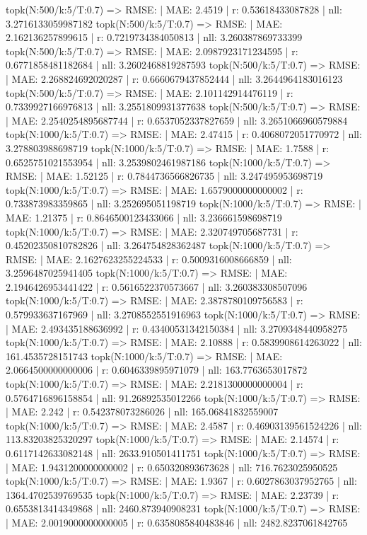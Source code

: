 topk(N:500/k:5/T:0.7) => RMSE: | MAE: 2.4519 | r: 0.53618433087828 | nll: 3.2716133059987182
topk(N:500/k:5/T:0.7) => RMSE: | MAE: 2.162136257899615 | r: 0.7219734384050813 | nll: 3.260387869733399
topk(N:500/k:5/T:0.7) => RMSE: | MAE: 2.0987923171234595 | r: 0.6771858481182684 | nll: 3.2602468819287593
topk(N:500/k:5/T:0.7) => RMSE: | MAE: 2.268824692020287 | r: 0.6660679437852444 | nll: 3.2644964183016123
topk(N:500/k:5/T:0.7) => RMSE: | MAE: 2.101142914476119 | r: 0.7339927166976813 | nll: 3.2551809931377638
topk(N:500/k:5/T:0.7) => RMSE: | MAE: 2.2540254895687744 | r: 0.6537052337827659 | nll: 3.2651066960579884
topk(N:1000/k:5/T:0.7) => RMSE: | MAE: 2.47415 | r: 0.4068072051770972 | nll: 3.278803988698719
topk(N:1000/k:5/T:0.7) => RMSE: | MAE: 1.7588 | r: 0.6525751021553954 | nll: 3.2539802461987186
topk(N:1000/k:5/T:0.7) => RMSE: | MAE: 1.52125 | r: 0.7844736566826735 | nll: 3.247495953698719
topk(N:1000/k:5/T:0.7) => RMSE: | MAE: 1.6579000000000002 | r: 0.733873983359865 | nll: 3.252695051198719
topk(N:1000/k:5/T:0.7) => RMSE: | MAE: 1.21375 | r: 0.8646500123433066 | nll: 3.236661598698719
topk(N:1000/k:5/T:0.7) => RMSE: | MAE: 2.320749705687731 | r: 0.45202350810782826 | nll: 3.264754828362487
topk(N:1000/k:5/T:0.7) => RMSE: | MAE: 2.1627623255224533 | r: 0.5009316008666859 | nll: 3.2596487025941405
topk(N:1000/k:5/T:0.7) => RMSE: | MAE: 2.1946426953441422 | r: 0.5616522370573667 | nll: 3.260383308507096
topk(N:1000/k:5/T:0.7) => RMSE: | MAE: 2.3878780109756583 | r: 0.579933637167969 | nll: 3.2708552551916963
topk(N:1000/k:5/T:0.7) => RMSE: | MAE: 2.493435188636992 | r: 0.43400531342150384 | nll: 3.2709348440958275
topk(N:1000/k:5/T:0.7) => RMSE: | MAE: 2.10888 | r: 0.5839908614263022 | nll: 161.4535728151743
topk(N:1000/k:5/T:0.7) => RMSE: | MAE: 2.0664500000000006 | r: 0.6046339895971079 | nll: 163.7763653017872
topk(N:1000/k:5/T:0.7) => RMSE: | MAE: 2.2181300000000004 | r: 0.5764716896158854 | nll: 91.26892535012266
topk(N:1000/k:5/T:0.7) => RMSE: | MAE: 2.242 | r: 0.542378073286026 | nll: 165.06841832559007
topk(N:1000/k:5/T:0.7) => RMSE: | MAE: 2.4587 | r: 0.46903139561524226 | nll: 113.83203825320297
topk(N:1000/k:5/T:0.7) => RMSE: | MAE: 2.14574 | r: 0.6117142633082148 | nll: 2633.910501411751
topk(N:1000/k:5/T:0.7) => RMSE: | MAE: 1.9431200000000002 | r: 0.650320893673628 | nll: 716.7623025950525
topk(N:1000/k:5/T:0.7) => RMSE: | MAE: 1.9367 | r: 0.6027863037952765 | nll: 1364.4702539769535
topk(N:1000/k:5/T:0.7) => RMSE: | MAE: 2.23739 | r: 0.6553813414349868 | nll: 2460.873940908231
topk(N:1000/k:5/T:0.7) => RMSE: | MAE: 2.0019000000000005 | r: 0.6358085840483846 | nll: 2482.8237061842765
